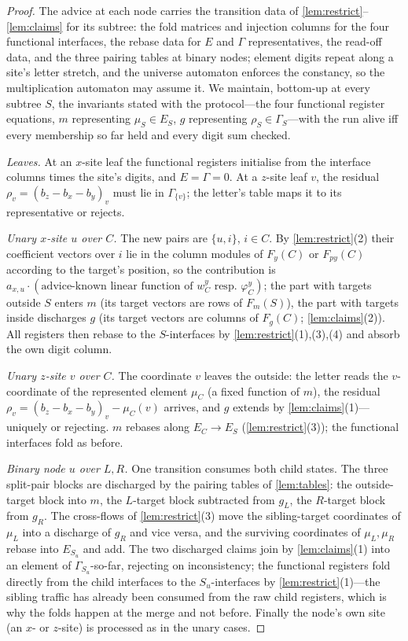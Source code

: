\documentclass[a4paper,UKenglish,autoref,anonymous]{lipics-v2021}
\begin{document}
\begin{proof}
The advice at each node carries the transition data of
\autoref{lem:restrict}--\autoref{lem:claims} for its subtree: the fold
matrices and injection columns for the four functional interfaces, the
rebase data for $E$ and $\Gamma$ representatives, the read-off data, and
the three pairing tables at binary nodes; element digits repeat along a
site's letter stretch, and the universe automaton enforces the
constancy, so the multiplication automaton may assume it. We maintain,
bottom-up at every subtree $S$, the invariants stated with the
protocol---the four functional register equations, $m$ representing
$\mu_S \in E_S$, $g$ representing $\rho_S \in \Gamma_S$---with the run
alive iff every membership so far held and every digit sum checked.

\emph{Leaves.} At an $x$-site leaf the functional registers initialise
from the interface columns times the site's digits, and $E = \Gamma =
0$. At a $z$-site leaf $v$, the residual $\rho_v = (b_z - b_x - b_y)_v$
must lie in $\Gamma_{\{v\}}$; the letter's table maps it to its
representative or rejects.

\emph{Unary $x$-site $u$ over $C$.} The new pairs are $\{u, i\}$, $i \in
C$. By \autoref{lem:restrict}(2) their coefficient vectors over $i$ lie
in the column modules of $F_y(C)$ or $F_{py}(C)$ according to the
target's position, so the contribution is $a_{x,u} \cdot
(\text{advice-known linear function of } w^y_C \text{ resp.\ }
\varphi^y_C)$; the part with targets outside $S$ enters $m$ (its target
vectors are rows of $F_m(S)$), the part with targets inside discharges
$g$ (its target vectors are columns of $F_g(C)$;
\autoref{lem:claims}(2)). All registers then rebase to the
$S$-interfaces by \autoref{lem:restrict}(1),(3),(4) and absorb the own
digit column.

\emph{Unary $z$-site $v$ over $C$.} The coordinate $v$ leaves the
outside: the letter reads the $v$-coordinate of the represented element
$\mu_C$ (a fixed function of $m$), the residual $\rho_v = (b_z - b_x -
b_y)_v - \mu_C(v)$ arrives, and $g$ extends by
\autoref{lem:claims}(1)---uniquely or rejecting. $m$ rebases along
$E_C \to E_S$ (\autoref{lem:restrict}(3)); the functional interfaces
fold as before.

\emph{Binary node $u$ over $L, R$.} One transition consumes both child
states. The three split-pair blocks are discharged by the pairing
tables of \autoref{lem:tables}: the outside-target block into $m$, the
$L$-target block subtracted from $g_L$, the $R$-target block from
$g_R$. The cross-flows of \autoref{lem:restrict}(3) move the
sibling-target coordinates of $\mu_L$ into a discharge of $g_R$ and
vice versa, and the surviving coordinates of $\mu_L, \mu_R$ rebase into
$E_{S_u}$ and add. The two discharged claims join by
\autoref{lem:claims}(1) into an element of $\Gamma_{S_u}$-so-far,
rejecting on inconsistency; the functional registers fold directly from
the child interfaces to the $S_u$-interfaces by
\autoref{lem:restrict}(1)---the sibling traffic has already been
consumed from the raw child registers, which is why the folds happen at
the merge and not before. Finally the node's own site (an $x$- or
$z$-site) is processed as in the unary cases.


\end{proof}
\end{document}
